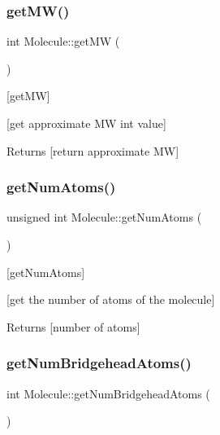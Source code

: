 \subsubsection{\texorpdfstring{get\+M\+W()}{getMW()}}
{\footnotesize\ttfamily int Molecule\+::get\+MW (\begin{DoxyParamCaption}{ }\end{DoxyParamCaption})}



\mbox{[}get\+MW\mbox{]} 

\mbox{[}get approximate MW int value\mbox{]}

\begin{DoxyReturn}{Returns}
\mbox{[}return approximate MW\mbox{]} 
\end{DoxyReturn}
\mbox{\label{class_molecule_a23bfc1c88f4aff43e87af062fe295922}} 
\subsubsection{\texorpdfstring{get\+Num\+Atoms()}{getNumAtoms()}}
{\footnotesize\ttfamily unsigned int Molecule\+::get\+Num\+Atoms (\begin{DoxyParamCaption}{ }\end{DoxyParamCaption})}



\mbox{[}get\+Num\+Atoms\mbox{]} 

\mbox{[}get the number of atoms of the molecule\mbox{]} \begin{DoxyReturn}{Returns}
\mbox{[}number of atoms\mbox{]} 
\end{DoxyReturn}
\mbox{\label{class_molecule_a9d22135d69888e8d269ac5384a424f83}} 
\subsubsection{\texorpdfstring{get\+Num\+Bridgehead\+Atoms()}{getNumBridgeheadAtoms()}}
{\footnotesize\ttfamily int Molecule\+::get\+Num\+Bridgehead\+Atoms (\begin{DoxyParamCaption}{ }\end{DoxyParamCaption})}



